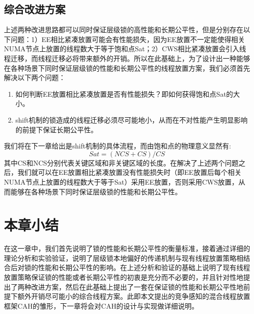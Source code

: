 \subsection{综合改进方案}
上述两种改进思路都可以同时保证层级锁的高性能和长期公平性，但是分别存在以下问题：1）EE相比紧凑放置可能会有性能损失，因为EE放置不一定能使得相关NUMA节点上放置的线程数大于等于饱和点Sat；2）CWS相比紧凑放置会引入线程迁移，而线程迁移必将带来额外的开销。所以在此基础上，为了设计出一种能够在各种场景下同时保证层级锁的性能和长期公平性的线程放置方案，我们必须首先解决以下两个问题：
\begin{enumerate}
    \item 如何判断EE放置相比紧凑放置是否有性能损失？即如何获得饱和点Sat的大小。
    \item shift机制的锁造成的线程迁移必须尽可能地小，从而在不对性能产生明显影响的前提下保证长期公平性。
\end{enumerate}
我们将在下一章给出是shift机制的具体流程，而由饱和点的物理意义显然有:
\begin{equation}\label{Eq:sat}
     Sat = (NCS + CS) / CS
\end{equation}
其中CS和NCS分别代表关键区域和非关键区域的长度。在解决了上述两个问题之后，我们就可以在EE放置相比紧凑放置没有性能损失时（即EE放置后每个相关NUMA节点上放置的线程数大于等于Sat）采用EE放置，否则采用CWS放置，从而能够在各种场景下同时保证层级锁的性能和长期公平性。

\section{本章小结}
在这一章中，我们首先说明了锁的性能和长期公平性的衡量标准，接着通过详细的理论分析和实验验证，说明了层级锁本地偏好的传递机制与现有线程放置策略相结合后对锁的性能和长期公平性的影响。在上述分析和验证的基础上说明了现有线程放置策略保证锁的性能或者长期公平性的初衷是充分而不必要的，并且针对性地提出了两种改进方案，然后在此基础上提出了一套在保证锁的性能和长期公平性地前提下额外开销尽可能小的综合线程方案。此即本文提出的竞争感知的混合线程放置框架CAH的雏形，下一章将会对CAH的设计与实现做详细说明。